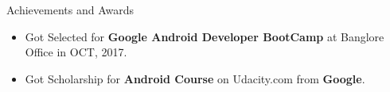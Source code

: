 \documentclass[]{mcdowellcv}
\begin{document}
	\begin{cvsection}{Achievements and Awards}
		\begin{cvsubsection}{}{}{}	
			\begin{itemize}
				\item Got Selected for \textbf{Google Android Developer BootCamp} at Banglore Office in OCT, 2017.
				\item Got Scholarship for \textbf{Android Course} on Udacity.com from \textbf{Google}.
			\end{itemize}
		\end{cvsubsection}
	\end{cvsection}
	
	
\end{document}
